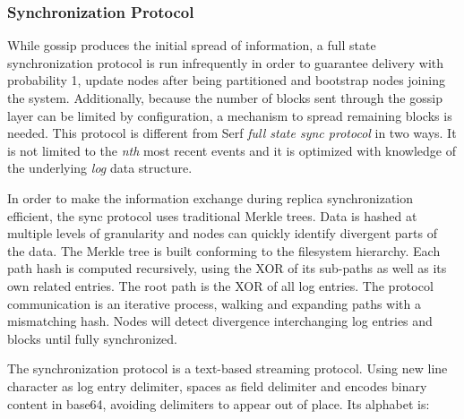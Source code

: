 \documentclass{sig-alternate}
\begin{document}
\subsubsection{Synchronization Protocol}

While gossip produces the initial spread of information, a full state synchronization protocol is run infrequently in order to guarantee delivery with probability 1, update nodes after being partitioned and bootstrap nodes joining the system. Additionally, because the number of blocks sent through the gossip layer can be limited by configuration, a mechanism to spread remaining blocks is needed. This protocol is different from Serf \textit{full state sync protocol} in two ways. It is not limited to the \textit{nth} most recent events and it is optimized with knowledge of the underlying \textit{log} data structure.


In order to make the information exchange during replica synchronization efficient, the sync protocol uses traditional Merkle trees. Data is hashed at multiple levels of granularity and nodes can quickly identify divergent parts of the data. The Merkle tree is built conforming to the filesystem hierarchy. Each path hash is computed recursively, using the XOR of its sub-paths as well as its own related entries. The root path is the XOR of all log entries. The protocol communication is an iterative process, walking and expanding paths with a mismatching hash. Nodes will detect divergence interchanging log entries and blocks until fully synchronized. 

The synchronization protocol is a text-based streaming protocol. Using new line character as log entry delimiter, spaces as field delimiter and encodes binary content in base64, avoiding delimiters to appear out of place. Its alphabet is:
\end{document}
